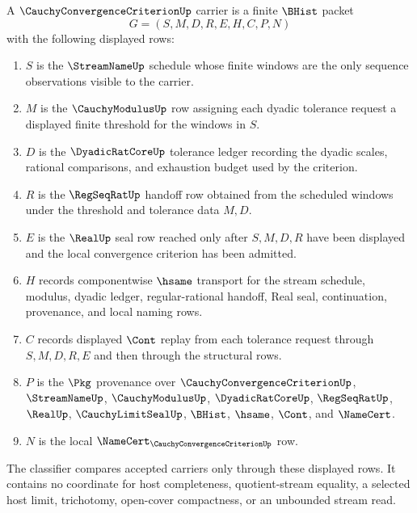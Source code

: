 \begin{definition}
\label{def:cauchy-convergence-criterion-carrier}
A $\CauchyConvergenceCriterionUp$ carrier is a finite $\BHist$ packet
$$
G=(S,M,D,R,E,H,C,P,N)
$$
with the following displayed rows:
\begin{enumerate}
\item $S$ is the $\StreamNameUp$ schedule whose finite windows are the only sequence observations visible to the carrier.
\item $M$ is the $\CauchyModulusUp$ row assigning each dyadic tolerance request a displayed finite threshold for the windows in $S$.
\item $D$ is the $\DyadicRatCoreUp$ tolerance ledger recording the dyadic scales, rational comparisons, and exhaustion budget used by the criterion.
\item $R$ is the $\RegSeqRatUp$ handoff row obtained from the scheduled windows under the threshold and tolerance data $M,D$.
\item $E$ is the $\RealUp$ seal row reached only after $S,M,D,R$ have been displayed and the local convergence criterion has been admitted.
\item $H$ records componentwise $\hsame$ transport for the stream schedule, modulus, dyadic ledger, regular-rational handoff, Real seal, continuation, provenance, and local naming rows.
\item $C$ records displayed $\Cont$ replay from each tolerance request through $S,M,D,R,E$ and then through the structural rows.
\item $P$ is the $\Pkg$ provenance over $\CauchyConvergenceCriterionUp$, $\StreamNameUp$, $\CauchyModulusUp$, $\DyadicRatCoreUp$, $\RegSeqRatUp$, $\RealUp$, $\CauchyLimitSealUp$, $\BHist$, $\hsame$, $\Cont$, and $\NameCert$.
\item $N$ is the local $\NameCert_{\CauchyConvergenceCriterionUp}$ row.
\end{enumerate}
The classifier compares accepted carriers only through these displayed rows. It contains no coordinate for host completeness, quotient-stream equality, a selected host limit, trichotomy, open-cover compactness, or an unbounded stream read.
\end{definition}

